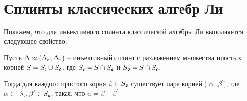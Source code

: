\section{Сплинты классических алгебр Ли}
\label{sec:appendix}
Покажем, что для инъективного сплинта классической алгебры Ли выполняется следующее свойство:
\begin{Prop}
Пусть $\Delta \approx (\Delta _{\mathfrak{a}},\Delta _{\mathfrak{s}})$ -- инъективный сплинт с разложением множества простых корней  $S=S_{\frak{c}}\cup S_{\frak{d}}$, где $S_{\frak{c}}=S\cap S_{\mathfrak{a}}$ и $S_{\frak{d}}=S\cap S_{\mathfrak{s}}$.

Тогда для каждого простого корня  $\beta \in S_{\mathfrak{s}}$ существует пара корней  ( $\alpha $ ,$\beta ^{\prime }$), где $\alpha \in $ $S_{\frak{c}},\beta ^{\prime }\in S_{\mathfrak{s}}$, такая, что $\alpha =\beta-\beta ^{\prime }$
\end{Prop}
